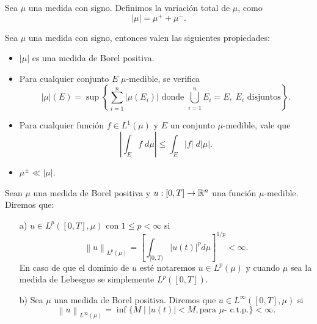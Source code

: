\begin{defi}
    Sea $\mu$ una medida con signo. Definimos la variación total de $\mu$, como 
    \begin{equation*}
        |\mu|=\mu^+ +\mu^-.
    \end{equation*}\index[Simbolo]{$\vert\mu\vert$}
\end{defi}


\begin{obs}
 Sea $\mu$ una medida con signo, entonces valen las siguientes propiedades: \label{obs:medida} 
 \begin{itemize}
 \item $|\mu|$ es una medida de Borel positiva.
     \item Para cualquier conjunto $E$ $\mu$-medible,  se verifica
 \begin{equation}
     |\mu|(E)=\sup\left\{\sum_{i=1}^n|\mu(E_i)| \text{ donde }\bigcup_{i=1}^nE_i=E, \; E_i \text{ disjuntos}  \right\}.
 \end{equation}

 \item Para cualquier función $f\in L^1(\mu)$ y $E$ un conjunto $\mu$-medible, vale que
 $$\left|\int_Ef\;d\mu\right|\leq \int_E|f|\; d|\mu|.$$
 \item $ \mu^{\pm}\ll |\mu|$.
 \end{itemize}
\end{obs}
\begin{defi} 
	Sean $\mu$ una medida de Borel positiva  y  $u:[0,T]\to \mathbb{R}^n$ una función $\mu$-medible. Diremos que:
	\begin{enumerate}
		\item [a)] $u\in L^p([0,T],\mu)$   con $1\leq p<\infty$ si 
		 $$\left\| u\right\|_{L^p(\mu)} =\left[ \int_{[0,T)}|u(t)|^p d\mu\right] ^{1/p}<\infty.$$
		En caso de que el dominio de $u$ esté  notaremos $u\in L^p(\mu)$ y cuando $\mu$ sea la medida de Lebesgue se  simplemente $L^p([0,T])$.
  
		\item [b)] Sea $\mu$ una medida de Borel positiva. Diremos que  $u\in L^\infty([0,T],\mu)$ si 
		$$\left\| u\right\|_{L^\infty(\mu)}=\inf\{M \mid |u(t)|<M, \text{para } \mu \text{- c.t.p.}\}  <\infty.$$
		
	\end{enumerate}
\end{defi}



